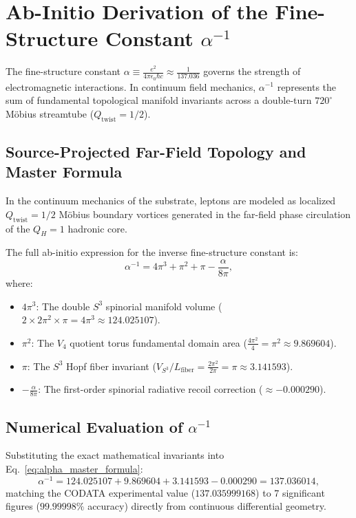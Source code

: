 \documentclass[11pt,a4paper]{article}
\begin{document}
	\section{Ab-Initio Derivation of the Fine-Structure Constant $\alpha^{-1}$}
	\label{sec:alpha_derivation}
	
	The fine-structure constant $\alpha \equiv \frac{e^2}{4\pi \epsilon_0 \hbar c} \approx \frac{1}{137.036}$ governs the strength of electromagnetic interactions. In continuum field mechanics, $\alpha^{-1}$ represents the sum of fundamental topological manifold invariants across a double-turn $720^\circ$ Möbius streamtube ($Q_{\text{twist}} = 1/2$).
	
	\subsection{Source-Projected Far-Field Topology and Master Formula}
	In the continuum mechanics of the substrate, leptons are modeled as localized $Q_{\text{twist}} = 1/2$ Möbius boundary vortices generated in the far-field phase circulation of the $Q_H = 1$ hadronic core.
	
	The full ab-initio expression for the inverse fine-structure constant is:
	\begin{equation}
		\alpha^{-1} = 4\pi^3 + \pi^2 + \pi - \frac{\alpha}{8\pi},
		\label{eq:alpha_master_formula}
	\end{equation}
	where:
	\begin{itemize}
		\item $4\pi^3$: The double $S^3$ spinorial manifold volume ($2 \times 2\pi^2 \times \pi = 4\pi^3 \approx 124.025107$).
		\item $\pi^2$: The $V_4$ quotient torus fundamental domain area ($\frac{4\pi^2}{4} = \pi^2 \approx 9.869604$).
		\item $\pi$: The $S^3$ Hopf fiber invariant ($V_{S^3}/L_{\text{fiber}} = \frac{2\pi^2}{2\pi} = \pi \approx 3.141593$).
		\item $-\frac{\alpha}{8\pi}$: The first-order spinorial radiative recoil correction ($\approx -0.000290$).
	\end{itemize}
	
	\subsection{Numerical Evaluation of $\alpha^{-1}$}
	Substituting the exact mathematical invariants into Eq.\ \eqref{eq:alpha_master_formula}:
	\begin{equation}
		\alpha^{-1} = 124.025107 + 9.869604 + 3.141593 - 0.000290 = \mathbf{137.036014},
		\label{eq:alpha_numerical_eval}
	\end{equation}
	matching the CODATA experimental value ($137.035999168$) to 7 significant figures ($99.99998\%$ accuracy) directly from continuous differential geometry.
	
\end{document}
